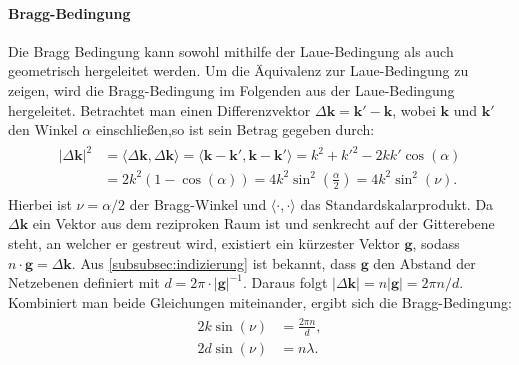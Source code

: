 \paragraph{Bragg-Bedingung}
Die Bragg Bedingung kann sowohl mithilfe der Laue-Bedingung als auch geometrisch hergeleitet werden.
Um die Äquivalenz zur Laue-Bedingung zu zeigen, wird die Bragg-Bedingung im Folgenden aus der Laue-Bedingung
hergeleitet.
Betrachtet man einen Differenzvektor $\Delta \mathbf{k}=\mathbf{k}'-\mathbf{k}$, wobei $\mathbf{k}$ und
$\mathbf{k'}$ den Winkel $\alpha$ einschließen,so ist sein Betrag gegeben durch:
\begin{align}
    \begin{split}
        \lvert \Delta \mathbf{k} \rvert ^{2}&=\langle \Delta \mathbf{k} ,\Delta \mathbf{k}\rangle =\langle
        \mathbf{k}-\mathbf{k}', \mathbf{k}-\mathbf{k}' \rangle = k^{2}+k'^{2}-2kk'\cos(\alpha)  \\
        &=2{k}^{2}(1-\cos(\alpha))=4k^{2}\sin ^{2}\left( \frac{\alpha}{2} \right)
        =4k^{2}\sin ^{2}( \nu).
    \end{split}
\end{align}
Hierbei ist $\nu = \alpha / 2$ der Bragg-Winkel und $\langle \cdot , \cdot \rangle$ das Standardskalarprodukt.
Da $\Delta \mathbf{k}$ ein Vektor aus dem reziproken Raum ist und senkrecht auf der Gitterebene
steht, an welcher er gestreut wird, existiert ein kürzester Vektor $\mathbf{g}$, sodass
$n\cdot \mathbf{g} =\Delta \mathbf{k}$.
Aus \cref{subsubsec:indizierung} ist bekannt, dass $\mathbf{g}$ den Abstand der Netzebenen definiert
mit $d = 2 \pi \cdot\lvert \mathbf{g} \rvert ^{-1}$.
Daraus folgt $\lvert \Delta \mathbf{k} \rvert=n \lvert \mathbf{g} \rvert = 2\pi n/d$.
Kombiniert man beide Gleichungen miteinander, ergibt sich die Bragg-Bedingung:\autocite[125-126]{Ashcroft}
\begin{align}
    \begin{split}
        2k\sin(\nu)&=\frac{2\pi n}{d}, \\
        2d\sin(\nu)&=n \lambda.
    \end{split}
\end{align}

